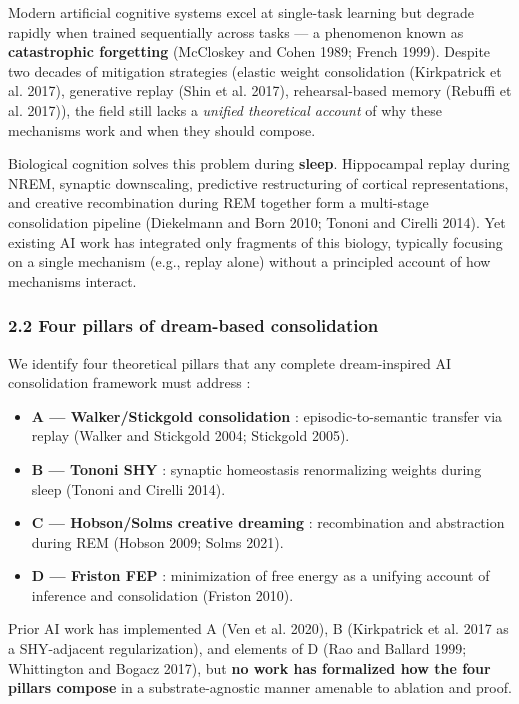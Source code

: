 \documentclass[
]{article}
\providecommand{\tightlist}{%
  \setlength{\itemsep}{0pt}\setlength{\parskip}{0pt}}
\begin{document}
Modern artificial cognitive systems excel at single-task learning but
degrade rapidly when trained sequentially across tasks --- a phenomenon
known as \textbf{catastrophic forgetting} (McCloskey and Cohen 1989;
French 1999). Despite two decades of mitigation strategies (elastic
weight consolidation ({Kirkpatrick et al.} 2017), generative replay
(Shin et al. 2017), rehearsal-based memory (Rebuffi et al. 2017)), the
field still lacks a \emph{unified theoretical account} of why these
mechanisms work and when they should compose.

Biological cognition solves this problem during \textbf{sleep}.
Hippocampal replay during NREM, synaptic downscaling, predictive
restructuring of cortical representations, and creative recombination
during REM together form a multi-stage consolidation pipeline
(Diekelmann and Born 2010; Tononi and Cirelli 2014). Yet existing AI
work has integrated only fragments of this biology, typically focusing
on a single mechanism (e.g., replay alone) without a principled account
of how mechanisms interact.

\subsubsection{2.2 Four pillars of dream-based
consolidation}\label{four-pillars-of-dream-based-consolidation}

We identify four theoretical pillars that any complete dream-inspired AI
consolidation framework must address :

\begin{itemize}
\tightlist
\item
  \textbf{A --- Walker/Stickgold consolidation} : episodic-to-semantic
  transfer via replay (Walker and Stickgold 2004; Stickgold 2005).
\item
  \textbf{B --- Tononi SHY} : synaptic homeostasis renormalizing weights
  during sleep (Tononi and Cirelli 2014).
\item
  \textbf{C --- Hobson/Solms creative dreaming} : recombination and
  abstraction during REM (Hobson 2009; Solms 2021).
\item
  \textbf{D --- Friston FEP} : minimization of free energy as a unifying
  account of inference and consolidation (Friston 2010).
\end{itemize}

Prior AI work has implemented A (Ven et al. 2020), B ({Kirkpatrick et
al.} 2017 as a SHY-adjacent regularization), and elements of D (Rao and
Ballard 1999; Whittington and Bogacz 2017), but \textbf{no work has
formalized how the four pillars compose} in a substrate-agnostic manner
amenable to ablation and proof.
\end{document}
